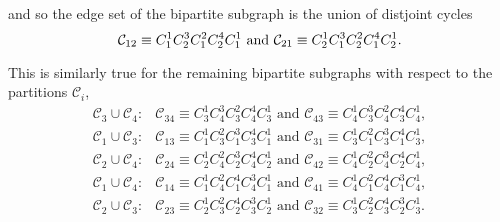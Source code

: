 \documentclass{unswthesis}
\begin{document}
and so the edge set of the bipartite subgraph is the union of distjoint
cycles%
\begin{equation}
\mathcal{C}_{12}\equiv C_{1}^{1}C_{2}^{3}C_{1}^{2}C_{2}^{4}C_{1}^{1}\text{
and }\mathcal{C}_{21}\equiv C_{2}^{1}C_{1}^{3}C_{2}^{2}C_{1}^{4}C_{2}^{1}. 
\notag
\end{equation}

This is similarly true for the remaining bipartite subgraphs with respect to
the partitions $\mathcal{C}_{i}$,%
\begin{equation*}
\begin{array}{cc}
\mathcal{C}_{3}\cup \mathcal{C}_{4}: & \mathcal{C}_{34}\equiv
C_{3}^{1}C_{4}^{3}C_{3}^{2}C_{4}^{4}C_{3}^{1}\text{ and }\mathcal{C}%
_{43}\equiv C_{4}^{1}C_{3}^{3}C_{4}^{2}C_{3}^{4}C_{4}^{1}, \\ 
\mathcal{C}_{1}\cup \mathcal{C}_{3}: & \mathcal{C}_{13}\equiv
C_{1}^{1}C_{3}^{2}C_{1}^{3}C_{3}^{4}C_{1}^{1}\text{ and }\mathcal{C}%
_{31}\equiv C_{3}^{1}C_{1}^{2}C_{3}^{3}C_{1}^{4}C_{3}^{1}, \\ 
\mathcal{C}_{2}\cup \mathcal{C}_{4}: & \mathcal{C}_{24}\equiv
C_{2}^{1}C_{4}^{2}C_{2}^{3}C_{4}^{4}C_{2}^{1}\text{ and }\mathcal{C}%
_{42}\equiv C_{4}^{1}C_{2}^{2}C_{4}^{3}C_{2}^{4}C_{4}^{1}, \\ 
\mathcal{C}_{1}\cup \mathcal{C}_{4}: & \mathcal{C}_{14}\equiv
C_{1}^{1}C_{4}^{2}C_{1}^{4}C_{4}^{3}C_{1}^{1}\text{ and }\mathcal{C}%
_{41}\equiv C_{4}^{1}C_{1}^{2}C_{4}^{4}C_{1}^{3}C_{4}^{1}, \\ 
\mathcal{C}_{2}\cup \mathcal{C}_{3}: & \mathcal{C}_{23}\equiv
C_{2}^{1}C_{3}^{2}C_{2}^{4}C_{3}^{3}C_{2}^{1}\text{ and }\mathcal{C}%
_{32}\equiv C_{3}^{1}C_{2}^{2}C_{3}^{4}C_{2}^{3}C_{3}^{1}.%
\end{array}%
\end{equation*}
\end{document}
